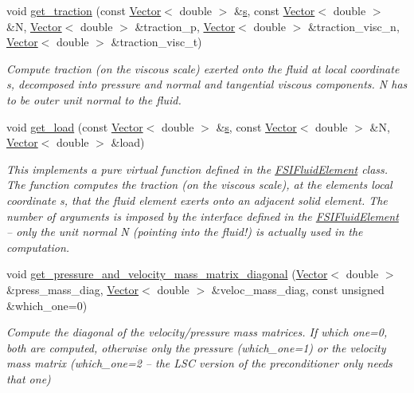 \begin{DoxyCompactItemize}
void \hyperlink{classoomph_1_1GeneralisedNewtonianNavierStokesEquations_a98e08b7402b4750ece2a18e4579a00dd}{get\+\_\+traction} (const \hyperlink{classoomph_1_1Vector}{Vector}$<$ double $>$ \&\hyperlink{cfortran_8h_ab7123126e4885ef647dd9c6e3807a21c}{s}, const \hyperlink{classoomph_1_1Vector}{Vector}$<$ double $>$ \&N, \hyperlink{classoomph_1_1Vector}{Vector}$<$ double $>$ \&traction\+\_\+p, \hyperlink{classoomph_1_1Vector}{Vector}$<$ double $>$ \&traction\+\_\+visc\+\_\+n, \hyperlink{classoomph_1_1Vector}{Vector}$<$ double $>$ \&traction\+\_\+visc\+\_\+t)
\begin{DoxyCompactList}\small\item\em Compute traction (on the viscous scale) exerted onto the fluid at local coordinate s, decomposed into pressure and normal and tangential viscous components. N has to be outer unit normal to the fluid. \end{DoxyCompactList}\item 
void \hyperlink{classoomph_1_1GeneralisedNewtonianNavierStokesEquations_ad69fe16e07deef80069fb1b27c19caa1}{get\+\_\+load} (const \hyperlink{classoomph_1_1Vector}{Vector}$<$ double $>$ \&\hyperlink{cfortran_8h_ab7123126e4885ef647dd9c6e3807a21c}{s}, const \hyperlink{classoomph_1_1Vector}{Vector}$<$ double $>$ \&N, \hyperlink{classoomph_1_1Vector}{Vector}$<$ double $>$ \&load)
\begin{DoxyCompactList}\small\item\em This implements a pure virtual function defined in the \hyperlink{classoomph_1_1FSIFluidElement}{F\+S\+I\+Fluid\+Element} class. The function computes the traction (on the viscous scale), at the element\textquotesingle{}s local coordinate s, that the fluid element exerts onto an adjacent solid element. The number of arguments is imposed by the interface defined in the \hyperlink{classoomph_1_1FSIFluidElement}{F\+S\+I\+Fluid\+Element} -- only the unit normal N (pointing into the fluid!) is actually used in the computation. \end{DoxyCompactList}\item 
void \hyperlink{classoomph_1_1GeneralisedNewtonianNavierStokesEquations_a6a7432333fec18d7e68efc3f99a02f16}{get\+\_\+pressure\+\_\+and\+\_\+velocity\+\_\+mass\+\_\+matrix\+\_\+diagonal} (\hyperlink{classoomph_1_1Vector}{Vector}$<$ double $>$ \&press\+\_\+mass\+\_\+diag, \hyperlink{classoomph_1_1Vector}{Vector}$<$ double $>$ \&veloc\+\_\+mass\+\_\+diag, const unsigned \&which\+\_\+one=0)
\begin{DoxyCompactList}\small\item\em Compute the diagonal of the velocity/pressure mass matrices. If which one=0, both are computed, otherwise only the pressure (which\+\_\+one=1) or the velocity mass matrix (which\+\_\+one=2 -- the L\+SC version of the preconditioner only needs that one) \end{DoxyCompactList}\item 

\end{DoxyCompactItemize}
